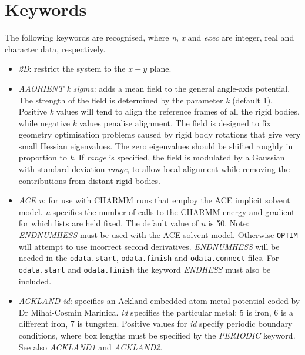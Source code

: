 \documentclass[12pt,a4paper,dvips]{article}
\begin{document}
\section{Keywords}
\label{sec:keywords}
\label{sect:keywords}

The following keywords are recognised, where {\it n\/}, {\it x\/} and {\it exec\/} are integer,
real and character data, respectively.
\smallskip
\begin{itemize}
\item {\it 2D}: restrict the system to the $x-y$ plane.

\item {\it AAORIENT k sigma}: adds a mean field to the general angle-axis potential.
The strength of the field is determined by the parameter {\it k\/} (default 1).
Positive {\it k\/} values will tend to align the reference frames of all the rigid
bodies, while negative {\it k\/} values penalise alignment. 
The field is designed to fix geometry optimisation problems caused by rigid
body rotations that give very small Hessian eigenvalues. 
The zero eigenvalues should be shifted roughly in proportion to {\it k\/}. 
If {\it range\/} is specified, the field is modulated by a Gaussian with standard
deviation {\it range\/}, to allow local alignment while removing the contributions
from distant rigid bodies.

\item {\it ACE n}: for use with CHARMM runs that employ the ACE implicit solvent model. 
{\it n} specifies the number of calls to the CHARMM energy and gradient for which lists
are held fixed. The default value of {\it n} is 50. 
Note: {\it ENDNUMHESS\/} must be used with the ACE solvent model. 
Otherwise {\tt OPTIM} will attempt to use incorrect second derivatives.
{\it ENDNUMHESS\/} will be needed in the {\tt odata.start}, {\tt odata.finish}
and {\tt odata.connect} files. 
For {\tt odata.start} and {\tt odata.finish} the keyword {\it ENDHESS}
must also be included.

\item {\it ACKLAND id\/}: specifies an Ackland embedded atom metal potential %
coded by Dr Mihai-Cosmin Marinica.
{\it id} specifies the particular metal: 5 is iron, 6 is a different iron,
7 is tungsten.
Positive values for {\it id} specify periodic boundary conditions, where box lengths must be
specified by the {\it PERIODIC\/} keyword. 
See also {\it ACKLAND1} and {\it ACKLAND2}.


\end{itemize}
\end{document}
